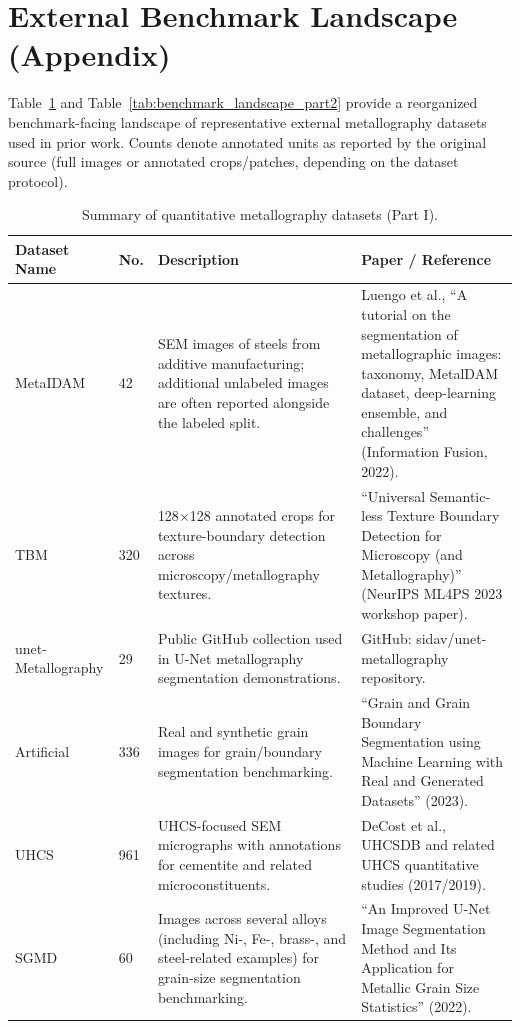 \documentclass{article}
\begin{document}
\section{External Benchmark Landscape (Appendix)}
Table~\ref{tab:benchmark_landscape} and Table~\ref{tab:benchmark_landscape_part2} provide a reorganized benchmark-facing landscape of representative external metallography datasets used in prior work. Counts denote annotated units as reported by the original source (full images or annotated crops/patches, depending on the dataset protocol).
\begin{table}[ht]
    \centering
    \scriptsize
    \caption{Summary of quantitative metallography datasets (Part I).}
    \label{tab:benchmark_landscape}
    \setlength{\tabcolsep}{3pt}
    \renewcommand{\arraystretch}{1.05}
    \begin{tabularx}{\textwidth}{p{}p{}X X}
        \toprule
        Dataset Name & No. & Description & Paper / Reference \\
        \midrule
        MetaIDAM & 42 & SEM images of steels from additive manufacturing; additional unlabeled images are often reported alongside the labeled split. & Luengo et al., ``A tutorial on the segmentation of metallographic images: taxonomy, MetalDAM dataset, deep-learning ensemble, and challenges'' (Information Fusion, 2022). \\
        TBM & 320 & 128$\times$128 annotated crops for texture-boundary detection across microscopy/metallography textures. & ``Universal Semantic-less Texture Boundary Detection for Microscopy (and Metallography)'' (NeurIPS ML4PS 2023 workshop paper). \\
        unet-Metallography & 29 & Public GitHub collection used in U-Net metallography segmentation demonstrations. & GitHub: sidav/unet-metallography repository. \\
        Artificial & 336 & Real and synthetic grain images for grain/boundary segmentation benchmarking. & ``Grain and Grain Boundary Segmentation using Machine Learning with Real and Generated Datasets'' (2023). \\
        UHCS & 961 & UHCS-focused SEM micrographs with annotations for cementite and related microconstituents. & DeCost et al., UHCSDB and related UHCS quantitative studies (2017/2019). \\
        SGMD & 60 & Images across several alloys (including Ni-, Fe-, brass-, and steel-related examples) for grain-size segmentation benchmarking. & ``An Improved U-Net Image Segmentation Method and Its Application for Metallic Grain Size Statistics'' (2022). \\
        \bottomrule
    \end{tabularx}
\end{table}
\end{document}
